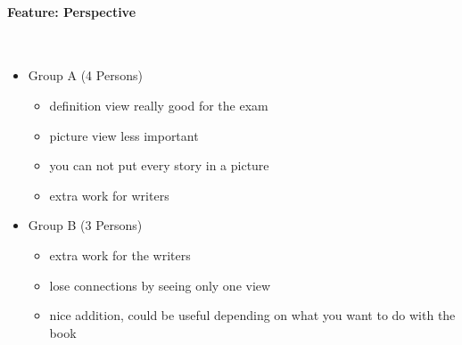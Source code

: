 \documentclass[main.tex]{subfiles}
\begin{document}
\paragraph{Feature: Perspective}~
\begin{itemize}
	\item Group A (4 Persons)
		\begin{itemize}
			\item definition view really good for the exam
			\item picture view less important
			\item you can not put every story in a picture
			\item extra work for writers
		\end{itemize}
	\item Group B (3 Persons)
		\begin{itemize}
			\item extra work for the writers
			\item lose connections by seeing only one view
			\item nice addition, could be useful depending on what you want to do with the book
		\end{itemize}
\end{itemize}
\end{document}
